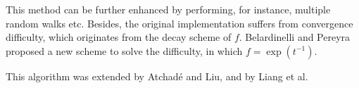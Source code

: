 This method can be further enhanced by performing, for instance, multiple random walks etc. Besides, the original implementation suffers from convergence difficulty, which originates from the decay scheme of $f$. Belardinelli and Pereyra proposed a new scheme to solve the difficulty, in which $f=\exp{(t^{-1})}$.\cite{BelardinelliPRE2007}

This algorithm was extended by Atchad\'{e} and Liu\cite{AtchadeSS2010}, and by Liang et al\cite{LiangJASA2007}.